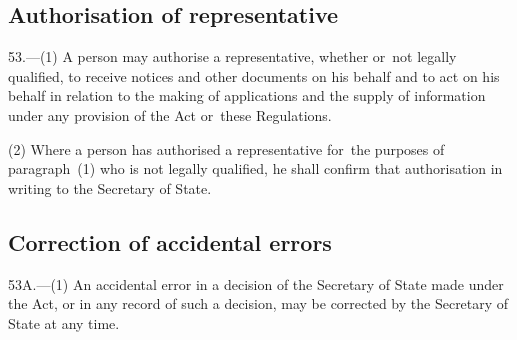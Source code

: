 \documentclass[a4paper,12pt]{article}
\begin{document}
%
%
%
%

\subsection[53. Authorisation of representative]{Authorisation of representative}

53.—(1) A person may authorise a representative, whether or~not legally qualified, to receive notices and other documents on his behalf and to act on his behalf in relation to the making of applications and the supply of information under any provision of the Act or~these Regulations.

(2) Where a person has authorised a representative for~the purposes of paragraph~(1) who is not legally qualified, he shall confirm that authorisation in writing to the Secretary of State.

\subsection[53A. Correction of accidental errors]{Correction of accidental errors}

53A.—(1) An accidental error in a decision of the Secretary of State made under the Act, or in any record of such a decision, may be corrected by the Secretary of State at any time.
\end{document}
